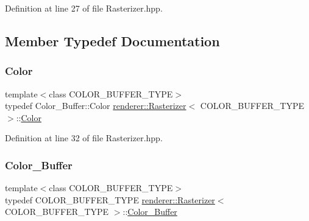 Definition at line 27 of file Rasterizer.\+hpp.



\subsection{Member Typedef Documentation}
\mbox{\label{classrenderer_1_1_rasterizer_a2f34497f55718e965d3ddc7fb9ef3fca}} 
\subsubsection{\texorpdfstring{Color}{Color}}
{\footnotesize\ttfamily template$<$class C\+O\+L\+O\+R\+\_\+\+B\+U\+F\+F\+E\+R\+\_\+\+T\+Y\+PE$>$ \\
typedef Color\+\_\+\+Buffer\+::\+Color \mbox{\hyperlink{classrenderer_1_1_rasterizer}{renderer\+::\+Rasterizer}}$<$ C\+O\+L\+O\+R\+\_\+\+B\+U\+F\+F\+E\+R\+\_\+\+T\+Y\+PE $>$\+::\mbox{\hyperlink{classrenderer_1_1_rasterizer_a2f34497f55718e965d3ddc7fb9ef3fca}{Color}}}



Definition at line 32 of file Rasterizer.\+hpp.

\mbox{\label{classrenderer_1_1_rasterizer_a1568956faf65b03116e04b4cb0213770}} 
\subsubsection{\texorpdfstring{Color\_Buffer}{Color\_Buffer}}
{\footnotesize\ttfamily template$<$class C\+O\+L\+O\+R\+\_\+\+B\+U\+F\+F\+E\+R\+\_\+\+T\+Y\+PE$>$ \\
typedef C\+O\+L\+O\+R\+\_\+\+B\+U\+F\+F\+E\+R\+\_\+\+T\+Y\+PE \mbox{\hyperlink{classrenderer_1_1_rasterizer}{renderer\+::\+Rasterizer}}$<$ C\+O\+L\+O\+R\+\_\+\+B\+U\+F\+F\+E\+R\+\_\+\+T\+Y\+PE $>$\+::\mbox{\hyperlink{classrenderer_1_1_rasterizer_a1568956faf65b03116e04b4cb0213770}{Color\+\_\+\+Buffer}}}



